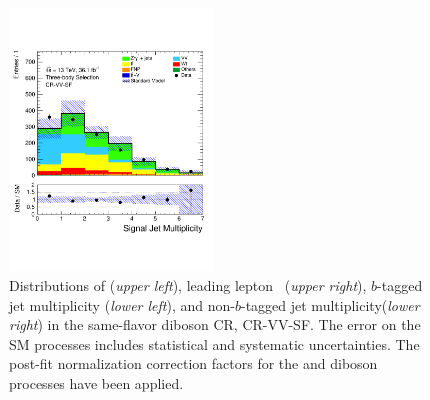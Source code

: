 \begin{figure}[!htb]
\begin{center}
        \includegraphics[width=0.48\textwidth]{figures/search_stop2l/bkg_est/crvsf/crvSF_nSJets}
        \caption{
            Distributions of \rpt (\textit{upper left}), leading lepton \gaminv~(\textit{upper right}),
            $b$-tagged jet multiplicity (\textit{lower left}), and non-$b$-tagged jet multiplicity(\textit{lower right}) in the same-flavor diboson CR,
            CR-VV-SF.
            The error on the SM processes includes statistical and systematic uncertainties.
            The post-fit normalization correction factors for the \ttbar and diboson processes
            have been applied.
        }
        \label{fig:crvvSF_1}
    \end{center}
\end{figure}

